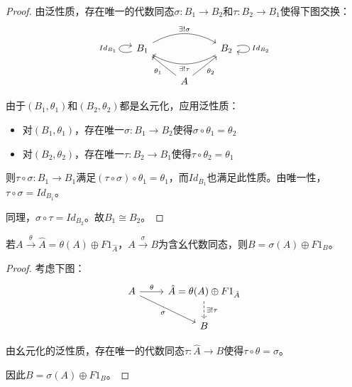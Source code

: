 \documentclass[lang=cn,a4paper,newtx,section]{elegantbook}
\begin{document}
\begin{proof}
  由泛性质，存在唯一的代数同态$\sigma: B_1 \to B_2$和$\tau: B_2 \to B_1$使得下图交换：
  \begin{equation*}
    \begin{tikzcd}
      B_1 \arrow[rr, "\exists! \sigma", bend left=30] \arrow[loop left, "Id_{B_1}"] & & B_2 \arrow[ll, "\exists! \tau", bend left=30] \arrow[loop right, "Id_{B_2}"] \\
      & A \arrow[ul, "\theta_1"] \arrow[ur, "\theta_2"'] &
    \end{tikzcd}
  \end{equation*}
  
  由于$(B_1, \theta_1)$和$(B_2, \theta_2)$都是幺元化，应用泛性质：
  \begin{itemize}
    \item 对$(B_1, \theta_1)$，存在唯一$\sigma: B_1 \to B_2$使得$\sigma \circ \theta_1 = \theta_2$
    \item 对$(B_2, \theta_2)$，存在唯一$\tau: B_2 \to B_1$使得$\tau \circ \theta_2 = \theta_1$
  \end{itemize}
  
  则$\tau \circ \sigma: B_1 \to B_1$满足$(\tau \circ \sigma) \circ \theta_1 = \theta_1$，而$Id_{B_1}$也满足此性质。由唯一性，$\tau \circ \sigma = Id_{B_1}$。
  
  同理，$\sigma \circ \tau = Id_{B_2}$。故$B_1 \cong B_2$。
\end{proof}

\begin{proposition}
  若$A \xrightarrow{\theta} \hat{A} = \theta(A) \oplus F1_{\hat{A}}$，$A \xrightarrow{\sigma} B$为含幺代数同态，则$B = \sigma(A) \oplus F1_B$。
\end{proposition}

\begin{proof}
  考虑下图：
  \begin{equation*}
    \begin{tikzcd}
      A \arrow[r, "\theta"] \arrow[dr, "\sigma"'] & \hat{A} = \theta(A) \oplus F1_{\hat{A}} \arrow[d, "\exists! \tau", dashed] \\
      & B
    \end{tikzcd}
  \end{equation*}
  
  由幺元化的泛性质，存在唯一的代数同态$\tau: \hat{A} \to B$使得$\tau \circ \theta = \sigma$。
  
  因此$B = \sigma(A) \oplus F1_B$。
\end{proof}
\end{document}
